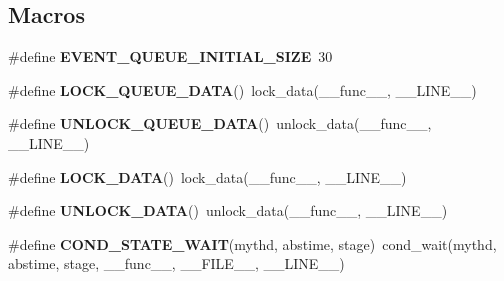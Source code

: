 \subsection*{Macros}
\begin{DoxyCompactItemize}
\item 
\mbox{\label{group__Event__Scheduler_ga42559d4cef1fc0f4efab81b69e903539}} 
\#define {\bfseries E\+V\+E\+N\+T\+\_\+\+Q\+U\+E\+U\+E\+\_\+\+I\+N\+I\+T\+I\+A\+L\+\_\+\+S\+I\+ZE}~30
\item 
\mbox{\label{group__Event__Scheduler_gaf37e6d23252f405250e2868cb78a1deb}} 
\#define {\bfseries L\+O\+C\+K\+\_\+\+Q\+U\+E\+U\+E\+\_\+\+D\+A\+TA}()~lock\+\_\+data(\+\_\+\+\_\+func\+\_\+\+\_\+, \+\_\+\+\_\+\+L\+I\+N\+E\+\_\+\+\_\+)
\item 
\mbox{\label{group__Event__Scheduler_ga847290ca395fac2cbe151e1fa5927bc7}} 
\#define {\bfseries U\+N\+L\+O\+C\+K\+\_\+\+Q\+U\+E\+U\+E\+\_\+\+D\+A\+TA}()~unlock\+\_\+data(\+\_\+\+\_\+func\+\_\+\+\_\+, \+\_\+\+\_\+\+L\+I\+N\+E\+\_\+\+\_\+)
\item 
\mbox{\label{group__Event__Scheduler_gaa0cd32193b17c7700b416b397f4942b8}} 
\#define {\bfseries L\+O\+C\+K\+\_\+\+D\+A\+TA}()~lock\+\_\+data(\+\_\+\+\_\+func\+\_\+\+\_\+, \+\_\+\+\_\+\+L\+I\+N\+E\+\_\+\+\_\+)
\item 
\mbox{\label{group__Event__Scheduler_gac45ef89b373af89f83369208fb1cddb3}} 
\#define {\bfseries U\+N\+L\+O\+C\+K\+\_\+\+D\+A\+TA}()~unlock\+\_\+data(\+\_\+\+\_\+func\+\_\+\+\_\+, \+\_\+\+\_\+\+L\+I\+N\+E\+\_\+\+\_\+)
\item 
\mbox{\label{group__Event__Scheduler_gad54a3f31376d084d7b3d70ff31fe9463}} 
\#define {\bfseries C\+O\+N\+D\+\_\+\+S\+T\+A\+T\+E\+\_\+\+W\+A\+IT}(mythd,  abstime,  stage)~cond\+\_\+wait(mythd, abstime, stage, \+\_\+\+\_\+func\+\_\+\+\_\+, \+\_\+\+\_\+\+F\+I\+L\+E\+\_\+\+\_\+, \+\_\+\+\_\+\+L\+I\+N\+E\+\_\+\+\_\+)
\end{DoxyCompactItemize}
